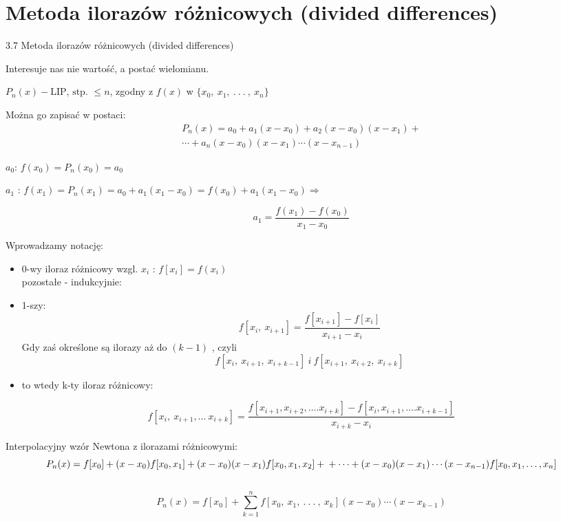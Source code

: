 \section{Metoda ilorazów różnicowych (divided differences)}
\begin{frame}
{3.7 Metoda ilorazów różnicowych (divided differences)}

Interesuje nas nie wartość, a postać wielomianu.

$P_{n}(x)-\text{LIP, stp. } \leq n$, zgodny z $f(x)$ w $\{x_{0},\ x_{1},\ .\ .\ .\ ,\ x_{n}\}$

Można go zapisać w postaci:
\begin{equation*}\begin{split}
P_{n}(x)=a_{0}+a_{1}(x-x_{0})+a_{2}(x-x_{0})(x-x_{1})+ \\
\cdots+a_{n}(x-x_{0})(x-x_{1})\cdots(x-x_{n-1})
\end{split}
\end{equation*}

$a_{0}$: $f(x_{0})=P_{n}(x_{0})=a_{0}$

$a_{1}$ : $f(x_{1})=P_{n}(x_{1})=a_{0}+a_{1}(x_{1}-x_{0})=f(x_{0})+a_{1}(x_{1}-x_{0}) \Rightarrow$

$$
a_{1}=\frac{f(x_{1})-f(x_{0})}{x_{1}-x_{0}}
$$
\end{frame}

\begin{frame}
Wprowadzamy notację:
\begin{itemize}
\item 0-wy iloraz różnicowy wzgl. $x_{i}$ : $f[x_{i}]=f(x_{i})$ \\
pozostałe - indukcyjnie:

\item 1-szy:
$$
f[x_{i},\ x_{i+1}]=\frac{f[x_{i+1}]-f[x_{i}]}{x_{i+1}-x_{i}}
$$
Gdy zaś określone są ilorazy aż do $(k-1)$ , czyli
$$
f[x_{i},\ x_{i+1},\ x_{i+k-1}] \: i \: f[x_{i+1},\ x_{i+2},\ x_{i+k}]
$$
\item to wtedy k-ty iloraz różnicowy:
\end{itemize}
$$
f[x_{i},\ x_{i+1}, ...\ x_{i+k}]=\frac{f[x_{i+1},x_{i+2},\ldots.x_{i+k}]-f[x_{i},x_{i+1},\ldots.x_{i+k-1}]}{x_{i+k}-x_{i}}
$$
\end{frame}

\begin{frame}
Interpolacyjny wzór Newtona z ilorazami różnicowymi:
$$
 P_{n}(x)=
   f[x_{0}]+(x-x_0) f[x_{0}, x_{1}]+(x-x_0) (x-x_1)f[x_{0},x_{1},x_{2}]+ \\
+ \cdots +(x-x_{0})(x-x_{1})\cdots(x-x_{n-1})f[x_{0},x_{1},\dots ,x_{n}]
$$\\
$$
P_{n}(x)=f[x_{0}]+\sum_{k=1}^{n}f[x_{0},\ x_{1},\ .\ .\ .\ ,\ x_{k}](x-x_{0})\cdots(x-x_{k-1})
$$

\end{frame}

